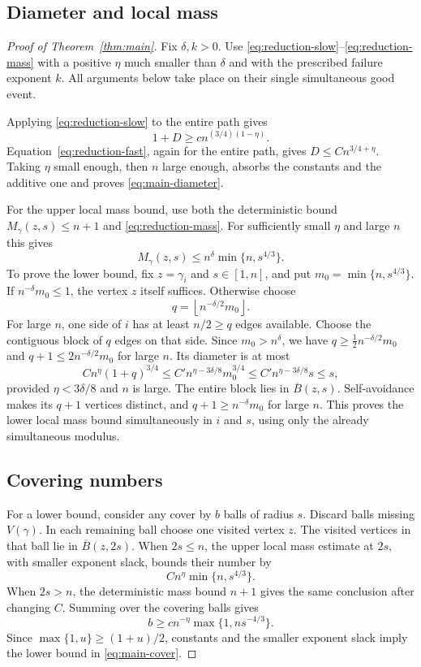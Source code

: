\subsection{Diameter and local mass}
\begin{proof}[Proof of Theorem~\ref{thm:main}]
Fix $\delta,k>0$. Use \eqref{eq:reduction-slow}--\eqref{eq:reduction-mass} with a positive $\eta$ much smaller than $\delta$ and with the prescribed failure exponent $k$. All arguments below take place on their single simultaneous good event.

Applying \eqref{eq:reduction-slow} to the entire path gives
\[
 1+D\ge c n^{(3/4)(1-\eta)}.
\]
Equation~\eqref{eq:reduction-fast}, again for the entire path, gives
$D\le Cn^{3/4+\eta}$. Taking $\eta$ small enough, then $n$ large enough, absorbs the constants and the additive one and proves \eqref{eq:main-diameter}.

For the upper local mass bound, use both the deterministic bound $M_\gamma(z,s)\le n+1$ and \eqref{eq:reduction-mass}. For sufficiently small $\eta$ and large $n$ this gives
\[
 M_\gamma(z,s)\le n^\delta\min\{n,s^{4/3}\}.
\]
To prove the lower bound, fix $z=\gamma_i$ and $s\in[1,n]$, and put
$m_0=\min\{n,s^{4/3}\}$. If $n^{-\delta}m_0\le1$, the vertex $z$ itself suffices. Otherwise choose
\[
 q=\left\lfloor n^{-\delta/2}m_0\right\rfloor.
\]
For large $n$, one side of $i$ has at least $n/2\ge q$ edges available. Choose the contiguous block of $q$ edges on that side. Since $m_0>n^\delta$, we have $q\ge\tfrac12n^{-\delta/2}m_0$ and $q+1\le2n^{-\delta/2}m_0$ for large $n$. Its diameter is at most
\[
 C n^\eta(1+q)^{3/4}
 \le C' n^{\eta-3\delta/8}m_0^{3/4}
 \le C' n^{\eta-3\delta/8}s\le s,
\]
provided $\eta<3\delta/8$ and $n$ is large. The entire block lies in $\overline B(z,s)$. Self-avoidance makes its $q+1$ vertices distinct, and
$q+1\ge n^{-\delta}m_0$ for large $n$. This proves the lower local mass bound simultaneously in $i$ and $s$, using only the already simultaneous modulus.

\subsection*{Covering numbers}
For a lower bound, consider any cover by $b$ balls of radius $s$. Discard balls missing $V(\gamma)$. In each remaining ball choose one visited vertex $z$. The visited vertices in that ball lie in $\overline B(z,2s)$. When $2s\le n$, the upper local mass estimate at $2s$, with smaller exponent slack, bounds their number by
\[
 Cn^\eta\min\{n,s^{4/3}\}.
\]
When $2s>n$, the deterministic mass bound $n+1$ gives the same conclusion after changing $C$. Summing over the covering balls gives
\[
 b\ge c n^{-\eta}\max\{1,ns^{-4/3}\}.
\]
Since $\max\{1,u\}\ge(1+u)/2$, constants and the smaller exponent slack imply the lower bound in \eqref{eq:main-cover}.


\end{proof}
